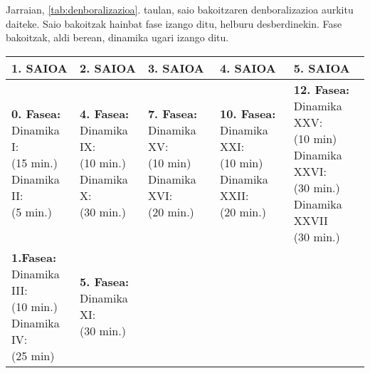 Jarraian, \ref{tab:denboralizazioa}. taulan, saio bakoitzaren denboralizazioa aurkitu daiteke. Saio bakoitzak hainbat fase izango ditu, helburu desberdinekin. Fase bakoitzak, aldi berean, dinamika ugari izango ditu.

\newpage
\begin{center}
    \label{tab:denboralizazioa}
    \begin{tabular}{|p{3cm}|p{3cm}|p{3cm}|p{3cm}|p{3cm}|}
        \hline
        \rowcolor[HTML]{D9D9D9} 
        \textbf{1. SAIOA} & \textbf{2. SAIOA} & \textbf{3. SAIOA} & \textbf{4. SAIOA} & \textbf{5. SAIOA}
        \\ \hline
        \makecell{\textbf{0. Fasea:}\\
        Dinamika I:\\(15 min.)\\
        Dinamika II:\\(5 min.)} & 
        \makecell{\textbf{4. Fasea:}\\
        Dinamika IX:\\(10 min.)\\
        Dinamika X:\\(30 min.)} & 
        \makecell{\textbf{7. Fasea:}\\
        Dinamika XV:\\(10 min)\\
        Dinamika XVI:\\(20 min.)} &
        \makecell{\textbf{10. Fasea:}\\
        Dinamika XXI:\\(10 min)\\
        Dinamika XXII:\\(20 min.)} & 
        \makecell{\textbf{12. Fasea:}\\
        Dinamika XXV:\\(10 min)\\
        Dinamika XXVI:\\(30 min.)\\
        Dinamika XXVII\\(30 min.)}
        \\ \hline
        \makecell{\textbf{1.Fasea:}\\
        Dinamika III:\\(10 min.)\\
        Dinamika IV:\\(25 min)} &
        \makecell{\textbf{5. Fasea:}\\
        Dinamika XI:\\(30 min.)\\
}
\end{tabular}
\end{center}
